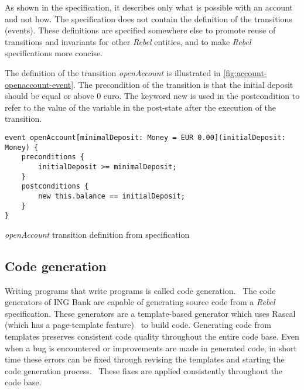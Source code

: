 As shown in the specification, it describes only what is possible with an
account and not how. The specification does not contain the definition of the
transitions (events). These definitions are specified somewhere else to promote reuse of
transitions and invariants for other \textit{Rebel} entities, and to make
\textit{Rebel} specifications more concise.~\cite[p.~4]{stoel_storm_vinju_bosman_2016}

The definition of the transition \textit{openAccount} is illustrated in
\autoref{fig:account-openaccount-event}. The precondition of the transition is
that the initial deposit should be equal or above 0 euro. The keyword new is
used in the postcondition to refer to the value of the variable in the
post-state after the execution of the transition.~\cite[p.~4]{stoel_storm_vinju_bosman_2016}

\begin{sourcecode}[h!]
\begin{lstlisting}[]
event openAccount[minimalDeposit: Money = EUR 0.00](initialDeposit: Money) {
	preconditions {
		initialDeposit >= minimalDeposit;
	}
	postconditions {
		new this.balance == initialDeposit;
	}
}
\end{lstlisting}
\caption{\textit{openAccount} transition definition from specification}\label{fig:account-openaccount-event}
\end{sourcecode}
\FloatBarrier

\subsection{Code generation}\label{sec:ch2-codegen}

Writing programs that write programs is called code
generation.~\cite[p.~3]{herrington2003code} The code generators of ING Bank are
capable of generating source code from a \textit{Rebel} specification.
These generators are a template-based generator which uses Rascal (which has a
page-template feature)~\cite{RascalGTTSE} to build code.
Generating code from templates preserves consistent code quality throughout the
entire code base. Even when a bug is encountered or improvements are made in
generated code, in short time these errors can be fixed through revising the
templates and starting the code generation process.~\cite[p.~15-17]{herrington2003code}
These fixes are applied consistently throughout the code base.

